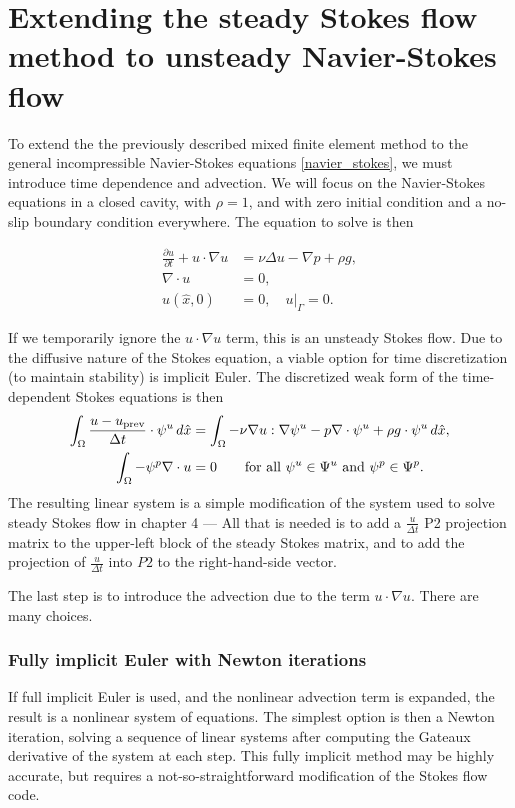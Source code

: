 \section{Extending the steady Stokes flow method to unsteady Navier-Stokes flow}

To extend the the previously described mixed finite element method to the general incompressible Navier-Stokes equations \eqref{navier_stokes},
we must introduce time dependence and advection. We will focus on the Navier-Stokes equations in a closed cavity, with $\rho = 1$, and with zero initial condition and
a no-slip boundary condition everywhere. The equation to solve is then

\begin{equation}\label{navier_stokes_ibvp}
\begin{split}
    \frac{\partial u}{\partial t} + u\cdot\nabla u &= \nu\Delta u - \nabla p + \rho g,\\
    \nabla\cdot u &= 0,\\
    u(\hat{x}, 0) &= 0, \quad \left.u\right|_\Gamma = 0.
\end{split}
\end{equation}

If we temporarily ignore the $u\cdot \nabla u$ term,
this is an unsteady Stokes flow.
Due to the diffusive nature of the Stokes equation, a viable option for time discretization (to maintain stability) is implicit Euler.
The discretized weak form of the time-dependent Stokes equations is then
\newcommand{\uprev}{{u_{\text{prev}}}}
\begin{equation}
\begin{split}
    \int_\om \frac{u - \uprev}{\Delta t}\cdot \psi^u\,d\hat{x}
        &= \int_\om -\nu \nabla u : \nabla \psi^u - p\nabla\cdot \psi^u + \rho g \cdot \psi^u\,d\hat{x},\\
    \int_\om -\psi^p \nabla\cdot u &= 0 \text{\quad\quad for all $\psi^u \in \Psi^u$ and $\psi^p \in \Psi^p$.}
\end{split}
\end{equation}
The resulting linear system is a simple modification of the system used to solve steady Stokes flow in chapter 4 ---
All that is needed is to add a $\frac{u}{\Delta t}$ P2 projection matrix to the upper-left block of the steady Stokes matrix,
and to add the projection of $\frac{u}{\Delta t}$ into $P2$ to the right-hand-side vector.

The last step is to introduce the advection due to the term $u\cdot \nabla u$. There are many choices.
\subsubsection{Fully implicit Euler with Newton iterations}
If full implicit Euler is used, and the nonlinear advection term is expanded, the result is a nonlinear system of equations.
The simplest option is then a Newton iteration, solving a sequence of linear systems after computing the Gateaux derivative of the system
at each step. This fully implicit method may be highly accurate, but requires a not-so-straightforward modification of the Stokes flow code.

